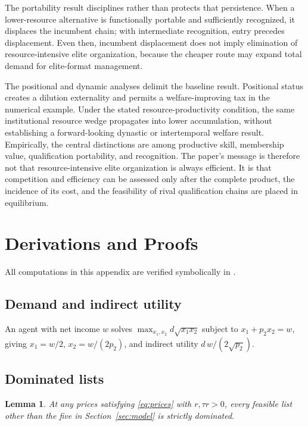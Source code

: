 \documentclass[12pt,letterpaper]{article}
\newtheorem{lemma}{Lemma}
\theoremstyle{definition}
\begin{document}
The portability result disciplines rather than protects that persistence.
When a lower-resource alternative is functionally portable and sufficiently recognized,
it displaces the incumbent chain; with intermediate recognition, entry precedes
displacement.
Even then, incumbent displacement does not imply elimination of resource-intensive elite
organization, because the cheaper route may expand total demand for elite-format
management.

The positional and dynamic analyses delimit the baseline result.
Positional status creates a dilution externality and permits a welfare-improving tax in
the numerical example.
Under the stated resource-productivity condition, the same institutional resource wedge
propagates into lower accumulation, without establishing a forward-looking dynastic or
intertemporal welfare result.
Empirically, the central distinctions are among productive skill, membership value,
qualification portability, and recognition.
The paper's message is therefore not that resource-intensive elite organization is always
efficient.
It is that competition and efficiency can be assessed only after the complete product,
the incidence of its cost, and the feasibility of rival qualification chains are placed
in equilibrium.

\appendix

\section{Derivations and Proofs}\label{app:derivations}

All computations in this appendix are verified symbolically in
.

\subsection{Demand and indirect utility}
An agent with net income $w$ solves $\max_{x_1,x_2} d\sqrt{x_1x_2}$ subject to $x_1+p_2x_2=w$, giving $x_1=w/2$, $x_2=w/(2p_2)$, and indirect utility $d\,w/(2\sqrt{p_2})$.

\subsection{Dominated lists}
\begin{lemma}\label{lem:dominated} At any prices satisfying \eqref{eq:prices} with $r,\tau r>0$, every feasible list other than the five in Section~\ref{sec:model} is strictly dominated.
\end{lemma}
\end{document}
